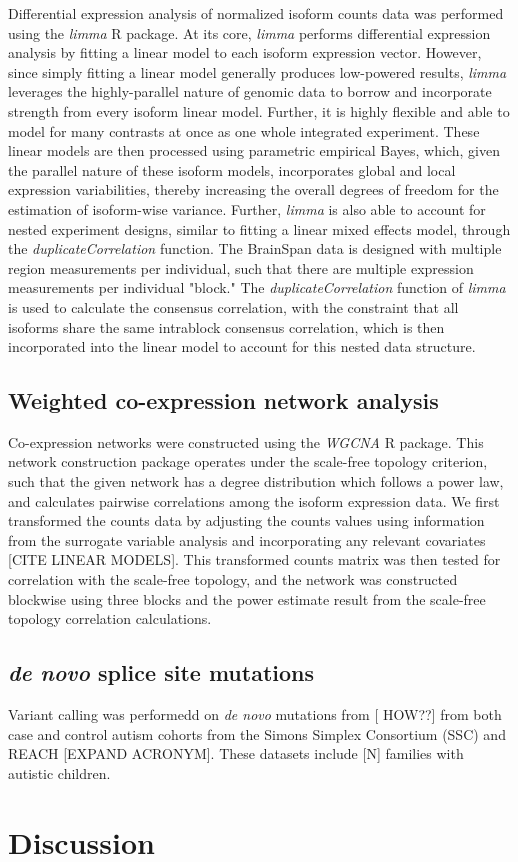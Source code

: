 Differential expression analysis of normalized isoform counts data was performed using the \textit{limma} R package. At its core, \textit{limma} performs differential expression analysis by fitting a linear model to each isoform expression vector. However, since simply fitting a linear model generally produces low-powered results, \textit{limma} leverages the highly-parallel nature of genomic data to borrow and incorporate strength from every isoform linear model. Further, it is highly flexible and able to model for many contrasts at once as one whole integrated experiment. These linear models are then processed using parametric empirical Bayes, which, given the parallel nature of these isoform models, incorporates global and local expression variabilities, thereby increasing the overall degrees of freedom for the estimation of isoform-wise variance. Further, \textit{limma} is also able to account for nested experiment designs, similar to fitting a linear mixed effects model, through the \textit{duplicateCorrelation} function. The BrainSpan data is designed with multiple region measurements per individual, such that there are multiple expression measurements per individual "block." The \textit{duplicateCorrelation} function of \textit{limma} is used to calculate the consensus correlation, with the constraint that all isoforms share the same intrablock consensus correlation, which is then incorporated into the linear model to account for this nested data structure. 

\subsection{Weighted co-expression network analysis}
Co-expression networks were constructed using the \textit{WGCNA} R package. This network construction package operates under the scale-free topology criterion, such that the given network has a degree distribution which follows a power law, and calculates pairwise correlations among the isoform expression data. We first transformed the counts data by adjusting the counts values using information from the surrogate variable analysis and incorporating any relevant covariates [CITE LINEAR MODELS]. This transformed counts matrix was then tested for correlation with the scale-free topology, and the network was constructed blockwise using three blocks and the power estimate result from the scale-free topology correlation calculations. 

\subsection{\textit{de novo} splice site mutations}
Variant calling was performedd on \textit{de novo} mutations from [	HOW??] from both case and control autism cohorts from the Simons Simplex Consortium (SSC) and REACH [EXPAND ACRONYM]. These datasets include [N] families with autistic children.

\section{Discussion}
